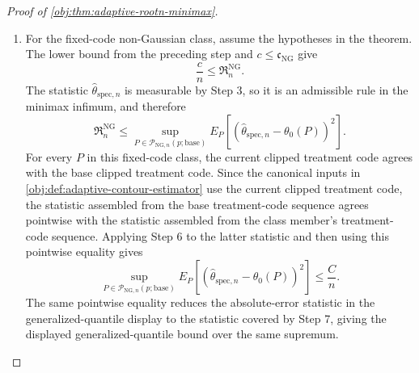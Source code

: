 \documentclass[11pt]{article}
\begin{document}
\begin{proof}[Proof of \cref{obj:thm:adaptive-rootn-minimax}]
\begin{enumerate}
For a nonempty fixed-code JMS ACE class, the separate fixed-code ACE converse applies the same two-point argument starting from a law in that JMS ACE class.  The affine perturbations preserve JMS ACE membership, the target values \(\theta_-\) and \(\theta_+\), the law of \((X,T)\), the nuisance functions \(g_0,q_0\), the treatment innovation \(\eta\), and both clipped supplied codes; this is the JMS ACE branch of \cref{obj:lem:non-gaussian-hard-submodel}.  The same product relative-entropy calculation and Le Cam inequality give a constant \(\mathfrak c_{\mathrm{JMS}}>0\), depending only on the primitive tuple, such that
\[
\frac{\mathfrak c_{\mathrm{JMS}}}{n}
\le
\inf_{\widetilde\theta}
\sup_{P\in\mathcal P_{\mathrm{ACE},n}^{\mathrm{JMS}}(p;\mathrm{base})}
E_P\!\left[(\widetilde\theta-\theta_0(P))^2\right].
\]

\item For the fixed-code non-Gaussian class, assume the hypotheses in the theorem.  The lower bound from the preceding step and \(c\le\mathfrak c_{\mathrm{NG}}\) give
\[
\frac{c}{n}\le \mathfrak R_n^{\mathrm{NG}}.
\]
The statistic \(\widehat\theta_{\mathrm{spec},n}\) is measurable by Step 3, so it is an admissible rule in the minimax infimum, and therefore
\[
\mathfrak R_n^{\mathrm{NG}}
\le
\sup_{P\in\mathcal P_{\mathrm{NG},n}(p;\mathrm{base})}
E_P\!\left[
(\widehat\theta_{\mathrm{spec},n}-\theta_0(P))^2
\right].
\]
For every \(P\) in this fixed-code class, the current clipped treatment code agrees with the base clipped treatment code.  Since the canonical inputs in \cref{obj:def:adaptive-contour-estimator} use the current clipped treatment code, the statistic assembled from the base treatment-code sequence agrees pointwise with the statistic assembled from the class member's treatment-code sequence.  Applying Step 6 to the latter statistic and then using this pointwise equality gives
\[
\sup_{P\in\mathcal P_{\mathrm{NG},n}(p;\mathrm{base})}
E_P\!\left[
(\widehat\theta_{\mathrm{spec},n}-\theta_0(P))^2
\right]
\le
\frac{C}{n}.
\]
The same pointwise equality reduces the absolute-error statistic in the generalized-quantile display to the statistic covered by Step 7, giving the displayed generalized-quantile bound over the same supremum. %


\end{enumerate}
\end{proof}
\end{document}
